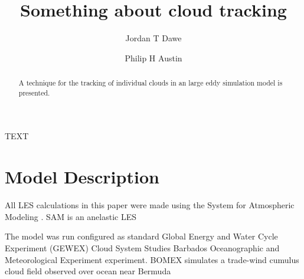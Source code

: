 \documentclass[acp]{copernicus}
\begin{document}
\title{Something about cloud tracking}


\author[1]{Jordan T Dawe}
\author[1]{Philip H Austin}










\received{}
\pubdiscuss{} %
\revised{}
\accepted{}
\published{}




\maketitle



\begin{abstract}
A technique for the tracking of individual clouds in an large eddy 
simulation model is presented.
\end{abstract}





\introduction
TEXT



\section{Model Description}

All LES calculations in this paper were made using the System for Atmospheric 
Modeling \citep[SAM;][]{Khairoutdinov2003}.  SAM is an anelastic LES 

The model was run configured as standard Global Energy and Water
Cycle Experiment (GEWEX) Cloud System Studies \citep[GCSS;][]{Randall2003}
Barbados Oceanographic and Meteorological Experiment 
\citep[BOMEX;][]{Siebesma2003} experiment.  BOMEX simulates a trade-wind cumulus 
cloud field observed over ocean near Bermuda
\end{document}
